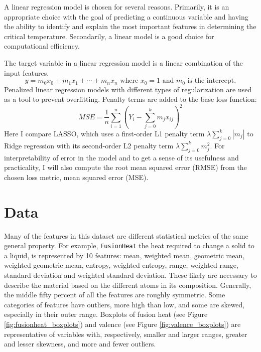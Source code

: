 \documentclass{article}      %
\begin{document}
A linear regression model is chosen for several reasons. Primarily, it is an appropriate choice with the goal of predicting a continuous variable and having the ability to identify and explain the most important features in determining the critical temperature. Secondarily, a linear model is a good choice for computational efficiency.

The target variable in a linear regression model is a linear combination of the input features.
\[ y = m_0x_0 + m_1x_1 + \cdots + m_nx_n \text{ where } x_0 = 1 \text{ and } m_0 \text{ is the intercept.} \]
Penalized linear regression models with different types of regularization are used as a tool to prevent overfitting. Penalty terms are added to the base loss function:
\[ MSE = \frac{1}{n} \sum_{i=1}^{n} \left(Y_i - \sum_{j=0}^{k} m_j x_{ij}\right)^2 \]
Here I compare LASSO, which uses a first-order L1 penalty term \( \lambda \sum_{j=0}^{k} |m_j| \) to Ridge regression with its second-order L2 penalty term \( \lambda \sum_{j=0}^{k} m_j^2 \). For interpretability of error in the model and to get a sense of its usefulness and practicality, I will also compute the root mean squared error (RMSE) from the chosen loss metric, mean squared error (MSE).

\section{Data}
Many of the features in this dataset are different statistical metrics of the same general property. For example, \texttt{FusionHeat} the heat required to change a solid to a liquid, is represented by 10 features: mean, weighted mean, geometric mean, weighted geometric mean, entropy, weighted entropy, range, weighted range, standard deviation and weighted standard deviation. These likely are necessary to describe the material based on the different atoms in its composition. Generally, the middle fifty percent of all the features are roughly symmetric. Some categories of features have outliers, more high than low, and some are skewed, especially in their outer range. Boxplots of fusion heat (see Figure \ref{fig:fusionheat_boxplots}) and valence (see Figure \ref{fig:valence_boxplots}) are representative of variables with, respectively, smaller and larger ranges, greater and lesser skewness, and more and fewer outliers.
\end{document}
